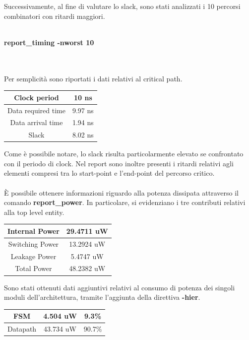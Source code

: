 \documentclass[11pt,  english, makeidx, a4paper, titlepage, oneside]{book}
\begin{document}
Successivamente, al fine di valutare lo slack, sono stati analizzati i 10 percorsi combinatori con ritardi maggiori.
\\\\
\centerline{\textbf{report\_timing -nworst 10}}
\\\\
Per semplicità sono riportati i dati relativi al critical path.
\\
\begin{center}
	\begin{tabular}{|c|c|}
	\hline
	Clock period & 10 ns\\
	\hline
	Data required time & 9.97 ns \\
	\hline
	Data arrival time & 1.94 ns \\
	\hline
	Slack & 8.02 ns \\
	\hline
	\end{tabular}	
\end{center}
\vspace{0.3cm}  
Come è possibile notare, lo slack risulta particolarmente elevato se confrontato con il periodo di clock.
Nel report sono inoltre presenti i ritardi relativi agli elementi compresi tra lo start-point e l'end-point del percorso critico.
\\\\
È possibile ottenere informazioni riguardo alla potenza dissipata attraverso il comando \textbf{report\_power}. In particolare, si evidenziano i tre contributi relativi alla top level entity.
\\
\begin{center}
	\begin{tabular}{|c|c|}
	\hline
	Internal Power & 29.4711 uW \\
	\hline
	Switching Power & 13.2924 uW \\
	\hline
	Leakage Power & 5.4747 uW \\
	\hline
	Total Power & 48.2382 uW \\
	\hline
	\end{tabular}	
\end{center}
\vspace{0.3cm}  
Sono stati ottenuti dati aggiuntivi relativi al consumo di potenza dei singoli moduli dell'architettura, tramite l'aggiunta della direttiva \textbf{-hier}.
\begin{center}
	\begin{tabular}{|c|c|c|}
	\hline
	FSM & 4.504 uW & 9.3\% \\
	\hline
	Datapath & 43.734 uW & 90.7\% \\
	\hline
	\end{tabular}	
\end{center}
\end{document}
